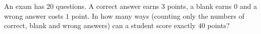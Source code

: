 An exam has $20$ questions. A correct answer earns $3$ points, a blank earns $0$ and a wrong answer costs $1$ point. In how many ways (counting only the numbers of correct, blank and wrong answers) can a student score exactly $40$ points?
